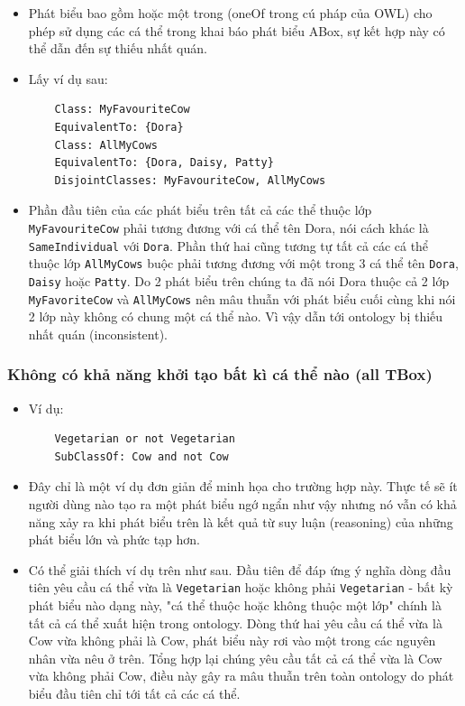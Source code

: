 \begin{itemize}
	\item 
	Phát biểu bao gồm hoặc một trong (oneOf trong cú pháp của OWL) cho phép sử dụng các cá thể trong khai báo phát biểu ABox, sự kết hợp này có thể dẫn đến sự thiếu nhất quán.
	\item
	Lấy ví dụ sau:
	\begin{verbatim}
	Class: MyFavouriteCow
	EquivalentTo: {Dora}
	Class: AllMyCows
	EquivalentTo: {Dora, Daisy, Patty}
	DisjointClasses: MyFavouriteCow, AllMyCows
	\end{verbatim}
	\item
	Phần đầu tiên của các phát biểu trên tất cả các thể thuộc lớp \texttt{MyFavouriteCow} phải tương đương với cá thể tên Dora, nói cách khác là \texttt{SameIndividual} với \texttt{Dora}. Phần thứ hai cũng  tương tự tất cả các cá thể thuộc lớp \texttt{AllMyCows} buộc phải tương đương với một trong 3 cá thể tên \texttt{Dora}, \texttt{Daisy} hoặc \texttt{Patty}. Do 2 phát biểu trên chúng ta đã nói Dora thuộc cả 2 lớp \texttt{MyFavoriteCow} và \texttt{AllMyCows} nên mâu thuẫn với phát biểu cuối cùng khi nói 2 lớp này không có chung một cá thể nào. Vì vậy dẫn tới ontology bị thiếu nhất quán (inconsistent).
\end{itemize}
\subsubsection{Không có khả năng khởi tạo bất kì cá thể nào (all TBox)}
\begin{itemize}
	\item Ví dụ:
	\begin{verbatim}
	Vegetarian or not Vegetarian
	SubClassOf: Cow and not Cow
	\end{verbatim}
	\item
	Đây chỉ là một ví dụ đơn giản để minh họa cho trường hợp này. Thực tế sẽ ít người dùng nào tạo ra một phát biểu ngớ ngẩn như vậy nhưng nó vẫn có khả năng xảy ra khi phát biểu trên là kết quả từ suy luận (reasoning) của những phát biểu lớn và phức tạp hơn.
	\item
	Có thể giải thích ví dụ trên như sau. Đầu tiên để đáp ứng ý nghĩa dòng đầu tiên yêu cầu cá thể vừa là \texttt{Vegetarian} hoặc không phải \texttt{Vegetarian} - bất kỳ phát biểu nào dạng này, "cá thể thuộc hoặc không thuộc một lớp" chính là tất cả cá thể xuất hiện trong ontology. Dòng thứ hai yêu cầu cá thể vừa là Cow vừa không phải là Cow, phát biểu này rơi vào một trong các nguyên nhân vừa nêu ở trên. Tổng hợp lại chúng yêu cầu tất cả cá thể vừa là Cow vừa không phải Cow, điều này gây ra mâu thuẫn trên toàn ontology do phát biểu đầu tiên chỉ tới tất cả các cá thể.
\end{itemize}


